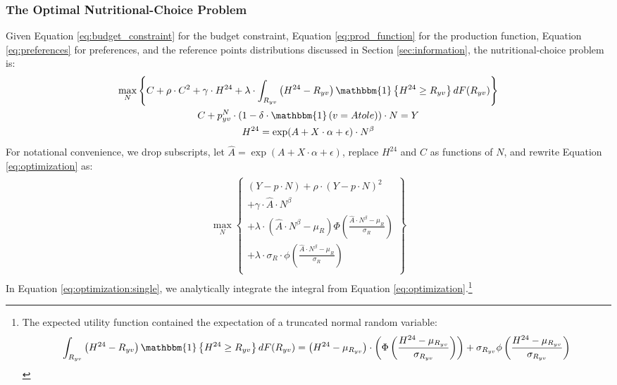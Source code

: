 \subsubsection{The Optimal Nutritional-Choice Problem\label{sec:fullproblem}}
Given Equation \eqref{eq:budget_constraint} for the budget constraint, Equation \eqref{eq:prod_function} for the production function, Equation \eqref{eq:preferences} for preferences, and the reference points distributions discussed in Section \ref{sec:information}, the nutritional-choice problem is:
\begin{align}
    \begin{gathered}\label{eq:optimization}
        \max_{N}
        \left\{
            C + \rho\cdot C^{2} +
            \gamma \cdot H^{24} +
            \lambda \cdot \int_{R_{yv}} \left(H^{24}-R_{yv}\right)\mathbbm{1}\left\{ H^{24}\ge R_{yv}\right\}dF(R_{yv})
        \right\}
        \\
        C + p^{N}_{yv}\cdot(1-\delta\cdot\mathbbm{1}\left(v=Atole\right))\cdot N = Y\\
        H^{24} = \exp(A+ X\cdot\alpha+\epsilon)\cdot N^{\beta}
    \end{gathered}
\end{align}
For notational convenience, we drop subscripts, let $\hat{A}=\exp\left(A + X\cdot\alpha + \epsilon\right)$, replace $H^{24}$ and $C$ as functions of $N$, and rewrite Equation \eqref{eq:optimization} as:
\begin{align}
    \begin{gathered}\label{eq:optimization:single}
        \max_{N}
        \left\{
        \begin{array}{c}
            \left(Y - p \cdot N\right) +
            \rho\cdot\left(Y - p \cdot N\right)^{2} \\
            + \gamma \cdot \hat{A} \cdot N^{\beta} \\
            + \lambda \cdot \left(\hat{A} \cdot N^{\beta}-\mu_R\right)
                    \Phi\left(\frac{\hat{A} \cdot N^{\beta}-\mu_R}{\sigma_R}
                \right) \\
            + \lambda \cdot \sigma_R \cdot \phi\left(
                \frac{\hat{A} \cdot N^{\beta}-\mu_R}{\sigma_R}
                \right) \\
        \end{array}
        \right\}
    \end{gathered}
\end{align}
In Equation \eqref{eq:optimization:single}, we analytically integrate the integral from Equation \eqref{eq:optimization}.\footnote{The expected utility function contained the expectation of a truncated normal random variable:
\begin{multline}
	\int_{R_{yv}} \left(H^{24}-R_{yv}\right)\mathbbm{1}\left\{ H^{24}\ge R_{yv}\right\}dF(R_{yv})=  \left(H^{24}-\mu_{R_{yv}}\right)\cdot\left(\Phi\left(\frac{H^{24}-\mu_{R_{yv}}}{\sigma_{R_{yv}}}\right)\right)+\sigma_{R_{yv}}\phi\left(\frac{H^{24}-\mu_{R_{yv}}}{\sigma_{R_{yv}}}\right) \label{eq:truncatedNormal}
\end{multline}}

